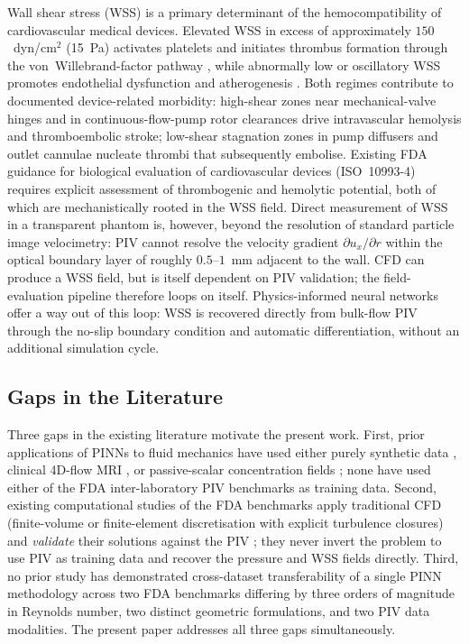 \documentclass[12pt,a4paper]{article}
\begin{document}
Wall shear stress (WSS) is a primary determinant of the
hemocompatibility of cardiovascular medical devices. Elevated
WSS in excess of approximately $150$~dyn/cm$^2$ (15~Pa) activates
platelets and initiates thrombus formation through the
von~Willebrand-factor pathway \cite{Shadden2013WSS}, while
abnormally low or oscillatory WSS promotes endothelial
dysfunction and atherogenesis \cite{Malek1999WSS}. Both regimes
contribute to documented device-related morbidity: high-shear
zones near mechanical-valve hinges and in
continuous-flow-pump rotor clearances drive intravascular
hemolysis and thromboembolic stroke; low-shear stagnation
zones in pump diffusers and outlet cannulae nucleate
thrombi that subsequently embolise. Existing FDA guidance for
biological evaluation of cardiovascular devices
(ISO~10993-4) requires explicit assessment of thrombogenic and
hemolytic potential, both of which are mechanistically rooted
in the WSS field. Direct measurement of WSS in a transparent
phantom is, however, beyond the resolution of standard
particle image velocimetry: PIV cannot resolve the velocity
gradient $\partial u_x / \partial r$ within the optical
boundary layer of roughly $0.5$--$1$~mm adjacent to the wall.
CFD can produce a WSS field, but is itself dependent on PIV
validation; the field-evaluation pipeline therefore loops on
itself. Physics-informed neural networks offer a way out of
this loop: WSS is recovered directly from bulk-flow PIV
through the no-slip boundary condition and automatic
differentiation, without an additional simulation cycle.

\subsection{Gaps in the Literature}
\label{sec:gaps}

Three gaps in the existing literature motivate the present
work. First, prior applications of PINNs to fluid mechanics
have used either purely synthetic data
\cite{Raissi2019PINN1, Lu2021DeepXDE}, clinical 4D-flow MRI
\cite{Kissas2020CardiacPINN, Arzani2021PINN_Blood}, or
passive-scalar concentration fields \cite{Raissi2020HFM}; none
have used either of the FDA inter-laboratory PIV benchmarks
\cite{Hariharan2011FDA, Hariharan2018BloodPump} as training
data. Second, existing computational studies of the FDA
benchmarks apply traditional CFD (finite-volume or
finite-element discretisation with explicit turbulence
closures) and \emph{validate} their solutions against the PIV
\cite{Stewart2012FDA, Steinman2013FDA, Ponnaluri2023PumpCFD};
they never invert the problem to use PIV as training data and
recover the pressure and WSS fields directly. Third, no
prior study has demonstrated cross-dataset transferability of
a single PINN methodology across two FDA benchmarks differing
by three orders of magnitude in Reynolds number, two distinct
geometric formulations, and two PIV data modalities. The
present paper addresses all three gaps simultaneously.
\end{document}

